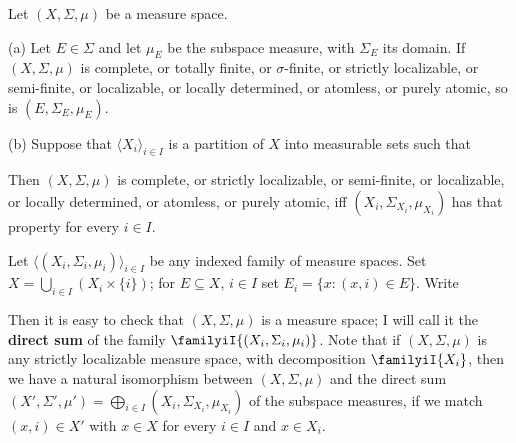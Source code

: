 Let $(X,\Sigma,\mu)$ be a measure space.

(a) Let $E\in\Sigma$ and let $\mu_E$ be the subspace measure, with
$\Sigma_E$ its domain.   If $(X,\Sigma,\mu)$ is complete, or totally
finite, or $\sigma$-finite, or strictly localizable, or semi-finite, or
localizable, or locally determined, or atomless, or purely atomic, so is
$(E,\Sigma_E,\mu_E)$.

(b) Suppose that $\langle X_i\rangle_{i\in I}$ is a partition of
$X$ into measurable sets such that


\noindent Then $(X,\Sigma,\mu)$ is complete, or strictly localizable, or
semi-finite, or localizable, or locally determined, or atomless, or
purely atomic, iff $(X_i,\Sigma_{X_i},\mu_{X_i})$ has that property for
every
$i\in I$.


 Let
$\langle(X_i,\Sigma_i,\mu_i)\rangle_{i\in I}$ be any indexed family of
measure spaces.   Set
$X=\bigcup_{i\in I}(X_i\times\{i\})$;  for $E\subseteq X$, $i\in I$ set
$E_i=\{x:(x,i)\in E\}$.   Write



\noindent Then it is easy to check that $(X,\Sigma,\mu)$ is a measure
space;  I will call it the {\bf direct sum} of the family
$\familyiI{(X_i,\Sigma_i,\mu_i)}$.   Note that if $(X,\Sigma,\mu)$ is
any strictly localizable measure space, with decomposition
$\familyiI{X_i}$,
then we have a natural isomorphism between $(X,\Sigma,\mu)$ and the
direct sum
$(X',\Sigma',\mu')=\bigoplus_{i\in I}(X_i,\Sigma_{X_i},\mu_{X_i})$ of
the subspace measures, if we match $(x,i)\in X'$ with $x\in X$ for every
$i\in I$ and $x\in X_i$.


